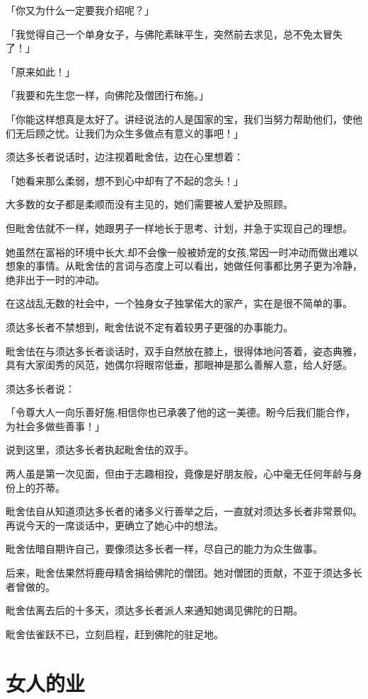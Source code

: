\documentclass[twoside,openany]{book}
\begin{document}
「你又为什么一定要我介绍呢？」

「我觉得自己一个单身女子，与佛陀素昧平生，突然前去求见，总不免太冒失了！」

「原来如此！」

「我要和先生您一样，向佛陀及僧团行布施。」

「你能这样想真是太好了。讲经说法的人是国家的宝，我们当努力帮助他们，使他们无后顾之忧。让我们为众生多做点有意义的事吧！」

须达多长者说话时，边注视着毗舍佉，边在心里想着：

「她看来那么柔弱，想不到心中却有了不起的念头！」

大多数的女子都是柔顺而没有主见的，她们需要被人爱护及照顾。

但毗舍佉就不一样，她跟男子一样地长于思考、计划，并急于实现自己的理想。

她虽然在富裕的环境中长大,却不会像一般被娇宠的女孩,常因一时冲动而做出难以想象的事情。从毗舍佉的言词与态度上可以看出，她做任何事都比男子更为冷静，绝非出于一时的冲动。

在这战乱无数的社会中，一个独身女子独掌偌大的家产，实在是很不简单的事。

须达多长者不禁想到，毗舍佉说不定有着较男子更强的办事能力。

毗舍佉在与须达多长者谈话时，双手自然放在膝上，很得体地问答着，姿态典雅，具有大家闺秀的风范，她偶尔将眼帘低垂，那眼神是那么善解人意，给人好感。

须达多长者说：

「令尊大人一向乐善好施,相信你也已承袭了他的这一美德。盼今后我们能合作，为社会多做些善事！」

说到这里，须达多长者执起毗舍佉的双手。

两人虽是第一次见面，但由于志趣相投，竟像是好朋友般，心中毫无任何年龄与身份上的芥蒂。

毗舍佉自从知道须达多长者的诸多义行善举之后，一直就对须达多长者非常景仰。再说今天的一席谈话中，更确立了她心中的想法。

毗舍佉暗自期许自己，要像须达多长者一样，尽自己的能力为众生做事。

后来，毗舍佉果然将鹿母精舍捐给佛陀的僧团。她对僧团的贡献，不亚于须达多长者曾做的。

毗舍佉离去后的十多天，须达多长者派人来通知她谒见佛陀的日期。

毗舍佉雀跃不已，立刻启程，赶到佛陀的驻足地。

\section{女人的业}\label{sec7.2}
\end{document}
